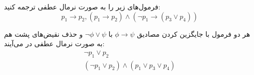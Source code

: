 فرمول‌های زیر را به صورت نرمال عطفی ترجمه کنید:
$$p_1\to p_2, (p_1\to p_2)\wedge (\neg p_1\to (p_3\vee p_4))$$
\begin{ans}
    هر دو فرمول با جایگزین کردن مصادیق
    $\phi\to\psi$
    با
    $\neg\phi\vee\psi$
    و حذف نقیض‌های پشت هم به صورت نرمال عطفی در می‌آیند:
    \begin{gather*}
        \neg p_1\vee p_2 \\
        (\neg p_1\vee p_2)\wedge (p_1\vee p_3\vee p_4)
    \end{gather*}
    

\end{ans}